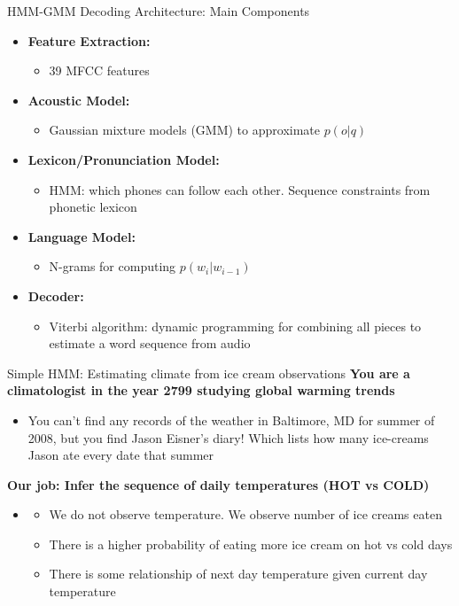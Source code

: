 \begin{frame}{HMM-GMM Decoding Architecture: Main Components}
  \begin{itemize}
    \item \textbf{Feature Extraction:}
      \begin{itemize}
        \item 39 MFCC features
      \end{itemize}
    \item \textbf{Acoustic Model:}
      \begin{itemize}
        \item Gaussian mixture models (GMM) to approximate $p(o|q)$
      \end{itemize}
    \item \textbf{Lexicon/Pronunciation Model:}
      \begin{itemize}
        \item HMM: which phones can follow each other. Sequence constraints from phonetic lexicon
      \end{itemize}
    \item \textbf{Language Model:}
      \begin{itemize}
        \item N-grams for computing $p(w_i|w_{i-1})$
      \end{itemize}
    \item \textbf{Decoder:}
      \begin{itemize}
        \item Viterbi algorithm: dynamic programming for combining all pieces to estimate a word sequence from audio
      \end{itemize}
  \end{itemize}
  \vfill
\end{frame}

\begin{frame}{Simple HMM: Estimating climate from ice cream observations}
  \textbf{You are a climatologist in the year 2799 studying global warming trends}
  \begin{itemize}
    \item You can't find any records of the weather in Baltimore, MD for summer of 2008, but you find Jason Eisner's diary! Which lists how many ice-creams Jason ate every date that summer
  \end{itemize}
  \vspace{0.8em}
  \textbf{Our job: Infer the sequence of daily temperatures (HOT vs COLD)}
  \begin{itemize}
    \item[] 
    \begin{itemize}
      \item We do not observe temperature. We observe number of ice creams eaten
      \item There is a higher probability of eating more ice cream on hot vs cold days
      \item There is some relationship of next day temperature given current day temperature
    \end{itemize}
  \end{itemize}
\end{frame}

